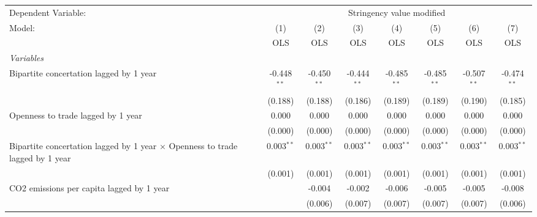 
\begingroup
\centering
\begin{tabular}{lccccccc}
   \toprule
   Dependent Variable: & \multicolumn{7}{c}{Stringency value modified}\\
   Model:                                                                               & (1)           & (2)           & (3)           & (4)           & (5)           & (6)           & (7)\\  
                                                                                        &  OLS          & OLS           & OLS           & OLS           & OLS           & OLS           & OLS\\  
   \midrule
   \emph{Variables}\\
   Bipartite concertation lagged by 1 year                                              & -0.448$^{**}$ & -0.450$^{**}$ & -0.444$^{**}$ & -0.485$^{**}$ & -0.485$^{**}$ & -0.507$^{**}$ & -0.474$^{**}$\\   
                                                                                        & (0.188)       & (0.188)       & (0.186)       & (0.189)       & (0.189)       & (0.190)       & (0.185)\\   
   Openness to trade lagged by 1 year                                                   & 0.000         & 0.000         & 0.000         & 0.000         & 0.000         & 0.000         & 0.000\\   
                                                                                        & (0.000)       & (0.000)       & (0.000)       & (0.000)       & (0.000)       & (0.000)       & (0.000)\\   
   Bipartite concertation lagged by 1 year $\times$ Openness to trade lagged by 1 year  & 0.003$^{**}$  & 0.003$^{**}$  & 0.003$^{**}$  & 0.003$^{**}$  & 0.003$^{**}$  & 0.003$^{**}$  & 0.003$^{**}$\\   
                                                                                        & (0.001)       & (0.001)       & (0.001)       & (0.001)       & (0.001)       & (0.001)       & (0.001)\\   
   CO2 emissions per capita lagged by 1 year                                            &               & -0.004        & -0.002        & -0.006        & -0.005        & -0.005        & -0.008\\   
                                                                                        &               & (0.006)       & (0.007)       & (0.007)       & (0.007)       & (0.007)       & (0.006)\\   

\end{tabular}
